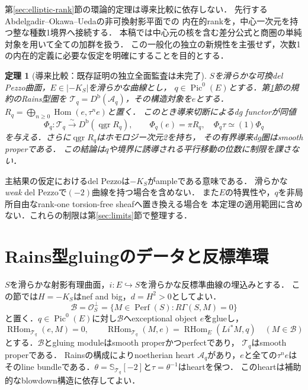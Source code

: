 \documentclass[11pt,a4paper]{ltjsarticle}
\newtheorem{theorem}{定理}[section]
\theoremstyle{definition}
\newcommand{\OO}{\mathcal O}
\newcommand{\BB}{\mathcal B}
\newcommand{\TT}{\mathcal T}
\renewcommand{\AA}{\mathcal A}
\newcommand{\SSer}{\mathbb S}
\newcommand{\Db}{D^{\mathrm b}}
\newcommand{\RHom}{\operatorname{RHom}}
\newcommand{\Hom}{\operatorname{Hom}}
\newcommand{\Perf}{\operatorname{Perf}}
\newcommand{\qgr}{\operatorname{qgr}}
\newcommand{\Pic}{\operatorname{Pic}}
\begin{document}
第\ref{sec:elliptic-rank}節の環論的定理は導来比較に依存しない．
先行するAbdelgadir--Okawa--Ueda\cite[Appendix~A]{AOU}の非可換射影平面での
内在的rankを，中心一次元を持つ整な種数1境界へ接続する．
本稿では中心元の核を含む差分公式と商圏の単純対象を用いて全ての加群を扱う．
この一般化の独立の新規性を主張せず，次数1の内在的定義に必要な仮定を明確にすることを目的とする．

\begin{theorem}[導来比較：既存証明の独立全面監査は未完了]\label{thm:main}
$S$を滑らかな可換del Pezzo曲面，$E\in|-K_S|$を滑らかな曲線とし，
$q\in\Pic^0(E)$とする．第\ref{sec:data}節の規約のRains型圏を
$\TT_q=\Db(\AA_q)$，その構造対象を$e$とする．
$R_q=\bigoplus_{n\geq0}\Hom(e,\tau^n e)$と置く．
このとき導来切断によるdg functorが同値
\[
 \Phi_q:\TT_q\xrightarrow{\sim}\Db(\qgr R_q),\qquad
 \Phi_q(e)=\pi R_q,\quad \Phi_q\tau\simeq(1)\Phi_q
\]
を与える．さらに$\qgr R_q$はホモロジー次元2を持ち，
その有界導来dg圏はsmooth properである．
この結論は$q$や境界に誘導される平行移動の位数に制限を課さない．
\end{theorem}

主結果の仮定におけるdel Pezzoは$-K_S$がampleである意味である．
滑らかな\emph{weak} del Pezzoで$(-2)$曲線を持つ場合を含めない．
また$E$の特異性や，$q$を非局所自由なrank-one torsion-free sheafへ置き換える場合を
本定理の適用範囲に含めない．これらの制限は第\ref{sec:limits}節で整理する．

\section{Rains型gluingのデータと反標準環}\label{sec:data}
$S$を滑らかな射影有理曲面，$i:E\hookrightarrow S$を滑らかな反標準曲線の埋込みとする．
この節では$H=-K_S$はnef and big，$d=H^2>0$としてよい．
\[
 \BB=\OO_S^\perp=\{M\in\Perf(S):R\Gamma(S,M)=0\}
\]
と置く．$q\in\Pic^0(E)$に対し$\BB$へexceptional object $e$をglueし，
\begin{equation}\label{eq:gluing}
 \RHom_{\TT_q}(e,M)=0,\qquad
 \RHom_{\TT_q}(M,e)=\RHom_E(Li^*M,q)\quad(M\in\BB)
\end{equation}
とする．$\BB$とgluing moduleはsmooth properかつperfectであり，
$\TT_q$はsmooth properである\cite[Theorem~3.25]{Orlov}．
Rainsの構成によりnoetherian heart $\AA_q$があり，$e$と全ての$\tau^n e$は
そのline bundleである．$\theta=\SSer_{\TT_q}[-2]$と$\tau=\theta^{-1}$はheartを保つ．
このheartは補助的なblowdown構造に依存してよい．
\end{document}
